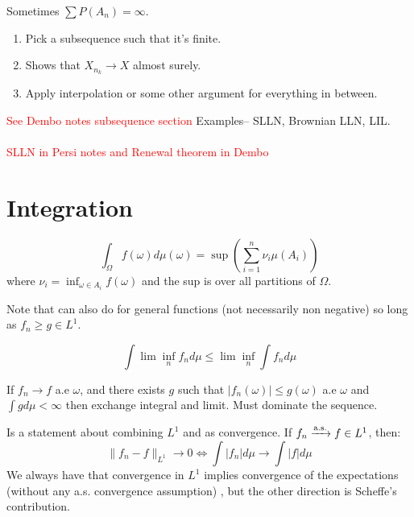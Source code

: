 \documentclass{article}
\newcommand\myworries[1]{\textcolor{red}{#1}}
\begin{document}
\begin{theorem}
Sometimes $\sum P(A_n) =\infty$. 
\begin{enumerate}
	\item Pick a subsequence such that it's finite. 
	\item Shows that $X_{n_k} \to X$ almost surely.
	\item Apply interpolation or some other argument for everything in between.
	
\end{enumerate}
\myworries{See Dembo notes subsequence section}
Examples-- SLLN, Brownian LLN, LIL. \\ \\

\myworries{SLLN in Persi notes and Renewal theorem in Dembo}

\end{theorem}

\section{Integration}
\begin{definition}
$$\int_\Omega f(\omega) d\mu(\omega) = \sup \left (\sum_{i=1}^n \nu_i \mu(A_i)\right)$$
where $\nu_i = \inf_{\omega \in A_i} f(\omega)$ and the sup is over all partitions of $\Omega$.
\end{definition}
\begin{theorem}[MCT]
Note that can also do for general functions (not necessarily non negative) so long as $f_n \geq g \in L^1$.
\end{theorem}
\begin{theorem}
$$\int \lim \inf_n f_n d\mu \leq \lim \inf_n \int f_n d\mu $$
\end{theorem}
\begin{theorem}[DCT]
If $f_n \to f$ a.e $\omega$, and there exists $g$ such that $|f_n(\omega)|\leq g(\omega)$ a.e $\omega$ and $\int gd\mu <\infty$ then exchange integral and limit. Must dominate the sequence. 
\end{theorem}

\begin{theorem}
Is a statement about combining $L^1$ and as convergence. If $f_n \xrightarrow{\mathrm{a.s.}} f\in L^1$, then:
$$\| f_n -f\|_{L^1} \to 0 \iff \int |f_n| d\mu \to \int |f|d\mu $$
We always have that convergence in $L^1$ implies convergence of the expectations (without any a.s. convergence assumption) , but the other direction is Scheffe's contribution. 
\end{theorem}
\end{document}
